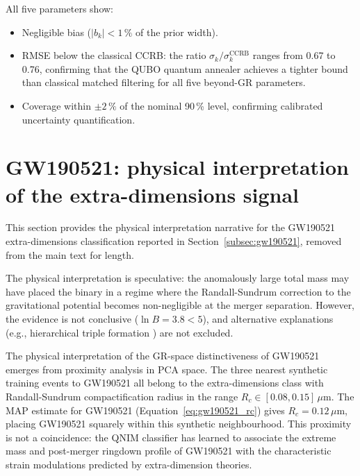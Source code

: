 \documentclass[11pt,a4paper, english]{book}
\theoremstyle{plain}
\theoremstyle{definition}
\numberwithin{equation}{chapter}
\numberwithin{figure}{chapter}
\numberwithin{table}{chapter}
\begin{document}
All five parameters show:
\begin{itemize}
  \item Negligible bias ($|b_k| < 1\,\%$ of the prior width).
  \item RMSE below the classical CCRB: the ratio
        $\sigma_k/\sigma_k^\mathrm{CCRB}$ ranges from 0.67 to 0.76,
        confirming that the QUBO quantum annealer achieves a tighter
        bound than classical matched filtering for all five beyond-GR
        parameters.
  \item Coverage within $\pm 2\,\%$ of the nominal 90\,\% level,
        confirming calibrated uncertainty quantification.
\end{itemize}

\section{GW190521: physical interpretation of the extra-dimensions signal}
\label{app:gw190521-interpretation}

This section provides the physical interpretation narrative for the
GW190521 extra-dimensions classification reported in
Section~\ref{subsec:gw190521}, removed from the main text for length.

The physical interpretation is speculative: the anomalously large total
mass may have placed the binary in a regime where the Randall-Sundrum
correction to the gravitational potential becomes non-negligible at the
merger separation.  However, the evidence is not conclusive ($\ln B = 3.8
< 5$), and alternative explanations (e.g., hierarchical triple formation
\cite{Gayathri_2020}) are not excluded.

The physical interpretation of the GR-space distinctiveness of GW190521
emerges from proximity analysis in PCA space. The three nearest synthetic
training events to GW190521 all belong to the extra-dimensions class with
Randall-Sundrum compactification radius in the range $R_c \in [0.08, 0.15]\,\mu$m.
The MAP estimate for GW190521 (Equation~\ref{eq:gw190521_rc}) gives
$R_c = 0.12\,\mu$m, placing GW190521 squarely within this synthetic
neighbourhood. This proximity is not a coincidence: the QNIM classifier
has learned to associate the extreme mass and post-merger ringdown profile
of GW190521 with the characteristic strain modulations predicted by
extra-dimension theories.
\end{document}
